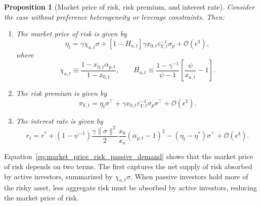 \documentclass[12pt,english]{article}
\newtheorem{prop}{Proposition}
\begin{document}
\begin{prop}[Market price of risk, risk premium, and interest rate]\label{prop:market_price_risk_risk_premium_interest_rate}
    Consider the case without preference heterogeneity or leverage constraints.
    Then:
    \begin{enumerate}
        \item The market price of risk is given by
        \begin{equation}\label{eq:market_price_risk_passive_demand}
            \eta_t
            =
            \gamma \chi_{a,t}\sigma
            +
            \left[1 - H_{a,t} \right]
            \gamma x_{0,t}\varepsilon_{Y,t}^{-1}\sigma_p
            +
            \mathcal{O}(\epsilon^3),
        \end{equation}
        where
        \[
            \chi_{a,t}
            \equiv
            \frac{1-x_{0,t}\overline{\alpha}_{p,t}}{1-x_{0,t}},
            \qquad
            H_{a,t}
            \equiv
            \frac{1-\gamma^{-1}}{\psi-1}
            \left[\frac{\psi}{x_{a,t}}-1\right].
        \]

        \item The risk premium is given by
        \begin{equation}\label{eq:risk_premium_passive_demand}
            \pi_{Y,t}
            =
            \eta_t \sigma^\top
            +
            \gamma x_{0,t}\varepsilon_{Y,t}^{-1}\sigma_p\sigma^\top
            +
            \mathcal{O}(\epsilon^3).
        \end{equation}

        \item The interest rate is given by
        \begin{equation}
            r_t
            =
            r^*
            +
            (1-\psi^{-1})
            \frac{\gamma\|\sigma\|^2}{2}
            \frac{x_0}{x_a}
            (\overline{\alpha}_{p,t}-1)^2
            -
            (\eta_t-\eta^*)\sigma^\top
            +
            \mathcal{O}(\epsilon^3).
        \end{equation}
    \end{enumerate}
\end{prop}

Equation~\eqref{eq:market_price_risk_passive_demand} shows that the market price of risk depends on two terms.
The first captures the net supply of risk absorbed by active investors, summarized by $\chi_{a,t}\sigma$.
When passive investors hold more of the risky asset, less aggregate risk must be absorbed by active investors, reducing the market price of risk.
\end{document}
